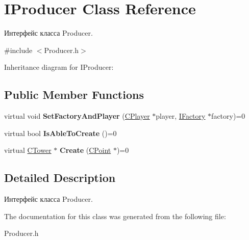\hypertarget{classIProducer}{}\section{I\+Producer Class Reference}
\label{classIProducer}


Интерфейс класса Producer.  




{\ttfamily \#include $<$Producer.\+h$>$}



Inheritance diagram for I\+Producer\+:
\subsection*{Public Member Functions}
\begin{DoxyCompactItemize}
\item 
virtual void {\bfseries Set\+Factory\+And\+Player} (\hyperlink{classCPlayer}{C\+Player} $\ast$player, \hyperlink{classIFactory}{I\+Factory} $\ast$factory)=0\hypertarget{classIProducer_a5432b60205e45d23d0ec57f92d1c670f}{}\label{classIProducer_a5432b60205e45d23d0ec57f92d1c670f}

\item 
virtual bool {\bfseries Is\+Able\+To\+Create} ()=0\hypertarget{classIProducer_afb1c0b7deae16b1cb94e6639e2fef99b}{}\label{classIProducer_afb1c0b7deae16b1cb94e6639e2fef99b}

\item 
virtual \hyperlink{classCTower}{C\+Tower} $\ast$ {\bfseries Create} (\hyperlink{classCPoint}{C\+Point} $\ast$)=0\hypertarget{classIProducer_a2395dc29b79b0116d799ee9944f631e3}{}\label{classIProducer_a2395dc29b79b0116d799ee9944f631e3}

\end{DoxyCompactItemize}


\subsection{Detailed Description}
Интерфейс класса Producer. 

The documentation for this class was generated from the following file\+:\begin{DoxyCompactItemize}
\item 
Producer.\+h\end{DoxyCompactItemize}
